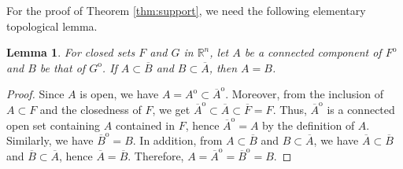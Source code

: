 \documentclass[11pt,oneside,english]{amsart}
\newcommand{\R}{{\mathbb R}}
\numberwithin{equation}{section}
\theoremstyle{plain}
\newtheorem{lemma}{Lemma}
\numberwithin{equation}{section}
\begin{document}
For the proof of Theorem \ref{thm:support}, we need the following  elementary topological lemma.

\begin{lemma}
    \label{lem:top}
For closed sets $F$ and $G$ in $\R^n$, let $A$ be a connected component of $F^{\mathrm{o}}$ and $B$ be that of $G^{\mathrm{o}}$. If $A\subset\overline B$ and $B\subset\overline A$, then $A=B$.    
\end{lemma}

\begin{proof}
Since $A$ is open, we have $A=A^{\mathrm{o}}\subset\overline A^{\mathrm{o}}$. Moreover, from the inclusion of $A\subset F$ and the closedness of $F$, we get $\overline A^{\mathrm{o}}\subset\overline A\subset \overline F=F$. Thus, $\overline A^{\mathrm{o}}$ is a connected open set containing $A$ contained in $F$, hence $\overline A^{\mathrm{o}}=A$ by the definition of $A$. Similarly, we have $\overline B^{\mathrm{o}}=B$. In addition, from $A\subset \overline B$ and $B\subset\overline A$, we have $\overline A\subset \overline B$ and $\overline B\subset\overline A$, hence $\overline A=\overline B$. Therefore, $A=\overline A^{\mathrm{o}}=\overline B^{\mathrm{o}}=B$.    
\end{proof}
\end{document}
